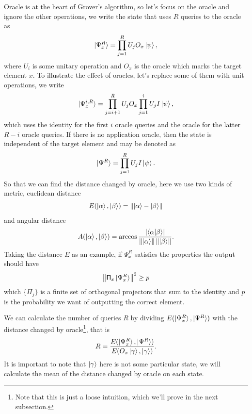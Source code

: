 \documentclass[a4paper,10pt]{book}
\numberwithin{equation}{section}
\begin{document}
Oracle is at the heart of Grover's algorithm, so let's focus on the oracle and ignore the other operations, we write the state that uses $R$ queries to the oracle as
\begin{equation}
    \ket{\Psi_{x}^{R}}=\prod_{j=1}^{R}U_{j}O_{x}\ket{\psi},
\end{equation}
where $U_{i}$ is some unitary operation and $O_{x}$ is the oracle which marks the target element $x$. To illustrate the effect of oracles, let's replace some of them with unit operations, we write
\begin{equation}
    \ket{\Psi_{x}^{i,R}}=\prod_{j=i+1}^{R}U_{j}O_{x}\prod_{j=1}^{i}U_{j}I\ket{\psi},
\end{equation}
which uses the identity for the first $i$ oracle queries and the oracle for the latter $R-i$ oracle queries. If there is no application oracle,  then the state is independent of the target element and may be denoted as
\begin{equation}
    \ket{\Psi^{R}}=\prod_{j=1}^{R}U_{j}I\ket{\psi}.
\end{equation}
So that we can find the distance changed by oracle, here we use two kinds of metric, euclidean distance
\begin{equation}
    E(\ket{\alpha},\ket{\beta})=\left\|\ket{\alpha}-\ket{\beta}\right\|
\end{equation}
and angular distance
\begin{equation}
    A(\ket{\alpha},\ket{\beta})=\arccos\frac{\left\lvert \braket{\alpha|\beta}\right\rvert}{\left\|\ket{\alpha}\right\|\left\|\ket{\beta}\right\|}.
\end{equation}
Taking the distance $E$ as an example, if $\Psi_{x}^{R}$ satisfies the properties the output should have
\begin{equation}\label{TheOutputWeWant}
    \left\| \mathsf{\Pi}_{x}\ket{\Psi_{x}^{R}} \right\|^{2} \geq p
\end{equation}
which $\{\mathsf{\Pi}_{j}\}$ is a finite set of orthogonal projectors that sum to the identity and $p$ is the probability we want of outputting the correct element.

We can calculate the number of queries $R$ by dividing $E(\ket{\Psi_{x}^{R}},\ket{\Psi^{R}})$ with the distance changed by oracle\footnote{Note that this is just a loose intuition, which we'll prove in the next subsection.}, that is
\begin{equation}\label{TheNumberForIteration}
    R=\frac{E(\ket{\Psi_{x}^{R}},\ket{\Psi^{R}})}{E(O_{x}\ket{\gamma},\ket{\gamma})}.
\end{equation}
It is important to note that $\ket{\gamma}$ here is not some particular state, we will calculate the mean of the distance changed by oracle on each state.
\end{document}
